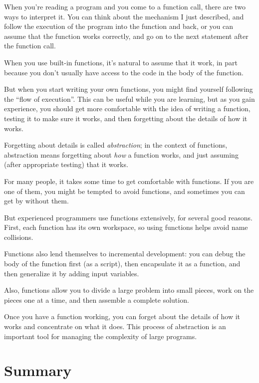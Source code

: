 When you're reading a program and you come to a function call,
there are two ways to interpret it. You can think about the mechanism I just described,
and follow the execution of the program into the function and back, or you can assume that the function works correctly, and go on to the next statement after the function call.

When you use built-in functions, it's natural to assume that it work, in part because you don't
usually have access to the code in the body of the function.

But when you start writing your own functions, you might
find yourself following the ``flow of execution''.  This can
be useful while you are learning, but as you gain experience, you
should get more comfortable with the idea of writing a function,
testing it to make sure it works, and then forgetting about the
details of how it works.


Forgetting about details is called {\em abstraction}; in the context
of functions, abstraction means forgetting about {\em how} a function
works, and just assuming (after appropriate testing) that it works.

For many people, it takes some time to get comfortable with functions.  If you are one of them, you might be tempted to avoid functions, and sometimes you can get by without them.

But experienced programmers use functions extensively, for several good reasons. First, each function has its own workspace, so using functions helps
avoid name collisions. 

Functions also lend themselves to incremental development: you can
debug the body of the function first (as a script), then encapsulate
it as a function, and then generalize it by adding input variables.

Also, functions allow you to divide a large problem into small
pieces, work on the pieces one at a time, and then assemble a
complete solution. 

Once you have a function working, you can forget about the
details of how it works and concentrate on what it does.  This
process of abstraction is an important tool for managing the
complexity of large programs.


\section{Summary}

